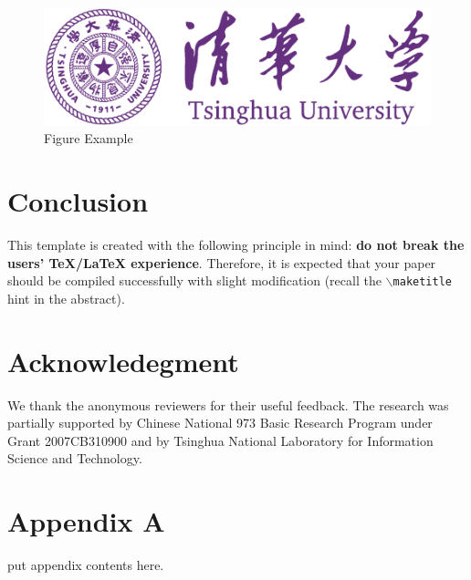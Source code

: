 \documentclass{ics}
\begin{document}
\begin{figure}
  \centering
  \includegraphics[width=.8\linewidth]{thu-whole-logo}
  \caption{Figure Example}
  \label{fig:example}
\end{figure}

\section{Conclusion}
\label{sec:conclusion}
This template is created with the following principle in mind: \textbf{do not
  break the users' \TeX/\LaTeX{} experience}. Therefore, it is expected that
your paper should be compiled successfully with slight modification (recall the
\texttt{$\backslash$maketitle} hint in the abstract).

\section*{Acknowledegment}
\label{sec:acknowledegment}
We thank the anonymous reviewers for their useful feedback. The research was
partially supported by Chinese National 973 Basic Research Program under Grant
2007CB310900 and by Tsinghua National Laboratory for Information Science and
Technology. 


\appendix
\section*{Appendix A}
put appendix contents here.


% 
% 
\end{document}

